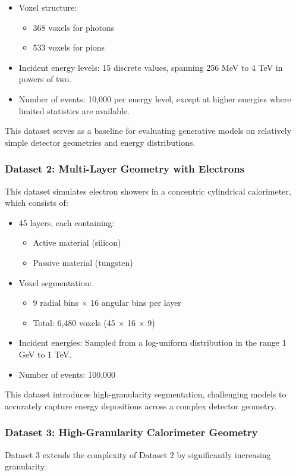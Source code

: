\begin{itemize}
    \item Voxel structure:  
    \begin{itemize}
        \item 368 voxels for photons  
        \item 533 voxels for pions  
    \end{itemize}
    \item Incident energy levels: 15 discrete values, spanning 256 MeV to 4 TeV in powers of two.  
    \item Number of events: 10,000 per energy level, except at higher energies where limited statistics are available.
\end{itemize}

This dataset serves as a baseline for evaluating generative models on relatively simple detector geometries and energy distributions.

\subsubsection{Dataset 2: Multi-Layer Geometry with Electrons}
This dataset simulates electron showers in a concentric cylindrical calorimeter, which consists of:
\begin{itemize}
    \item 45 layers, each containing:
    \begin{itemize}
        \item Active material (silicon)
        \item Passive material (tungsten)
    \end{itemize}
    \item Voxel segmentation:
    \begin{itemize}
        \item 9 radial bins $\times$ 16 angular bins per layer
        \item Total: 6,480 voxels (45 $\times$ 16 $\times$ 9)
    \end{itemize}
    \item Incident energies: Sampled from a log-uniform distribution in the range 1 GeV to 1 TeV.
    \item Number of events: 100,000
\end{itemize}

This dataset introduces high-granularity segmentation, challenging models to accurately capture energy depositions across a complex detector geometry.

\subsubsection{Dataset 3: High-Granularity Calorimeter Geometry}
Dataset 3 extends the complexity of Dataset 2 by significantly increasing granularity:

